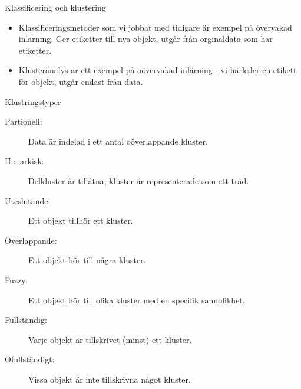 \documentclass[10pt,english]{beamer}
\begin{document}
\begin{frame}{Klassificering och klustering}

    \begin{itemize}
        \item Klassificeringsmetoder som vi jobbat med tidigare är exempel på övervakad inlärning. Ger etiketter till nya objekt, utgår från orginaldata som har etiketter.
        \item Klusteranalys är ett exempel på oövervakad inlärning - vi härleder en etikett för objekt, utgår endast från data.
    \end{itemize}
    
\end{frame}

\begin{frame}{Klustringstyper}

    \begin{description}
        \item[Partionell:] Data är indelad i ett antal oöverlappande kluster.
        \item[Hierarkisk:] Delkluster är tillåtna, kluster är representerade som ett träd.  
    \end{description}
    \vspace{1cm}
    \begin{description}
        \item[Uteslutande:] Ett objekt tillhör ett kluster.
        \item[Överlappande:] Ett objekt hör till några kluster.
        \item[Fuzzy:] Ett objekt hör till olika kluster med en specifik sannolikhet.  
    \end{description}
    \vspace{1cm}

    \begin{description}
        \item[Fullständig:] Varje objekt är tillskrivet (minst) ett kluster.
        \item[Ofullständigt:] Vissa objekt är inte tillskrivna något kluster. 
    \end{description}
    
\end{frame}
\end{document}
